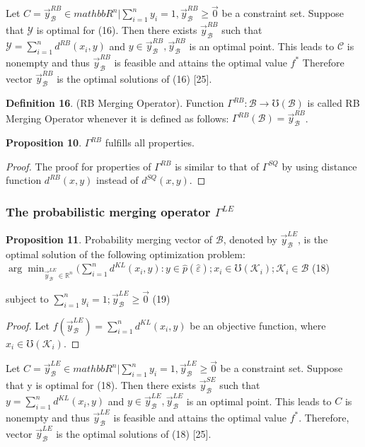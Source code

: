\documentclass[]{iosart2c}
\begin{document}
    Let $C = { \vec{y}^{RB}_\mathcal{B} \in mathbb{R}^n|\sum^n_{i=1} y_i = 1, \vec{y}^{RB}_\mathcal{B} \geq \vec{0} }$ be
    a constraint set. Suppose that $\mathcal{Y}$ is optimal for (16).
    Then there exists $\vec{y}^{RB}_\mathcal{B}$ such that $\mathcal{Y} = \sum^n_{i=1} d^{RB}(x_i, y)$
    and $y \in \vec{y}^{RB}_\mathcal{B} , \vec{y}^{RB}_\mathcal{B}$ is an optimal point. This leads to $\mathcal{C}$
    is nonempty and thus $\vec{y}^{RB}_\mathcal{B}$ is feasible and attains the
    optimal value $f^*$ Therefore vector $\vec{y}^{RB}_\mathcal{B}$ is the optimal
    solutions of (16) [25].

    \textbf{Definition 16}. (RB Merging Operator). Function
    $\Gamma^{RB} : \mathcal{B} \to \mho(\mathcal{B})$ is called RB Merging Operator
    whenever it is defined as follows: $\Gamma^{RB}(\mathcal{B}) = \vec{y}^{RB}_\mathcal{B}$.

    \textbf{Proposition 10}. $\Gamma^{RB}$ fulfills all properties.

    \begin{proof}
        The proof for properties of $\Gamma^{RB}$ is similar
        to that of $\Gamma^{SQ}$ by using distance function $d^{RB}(x, y)$
        instead of $d^{SQ}(x, y)$.
    \end{proof}

    \subsubsection{The probabilistic merging operator $\Gamma^{LE}$}

    \textbf{Proposition 11}. Probability merging vector of $\mathcal{B}$,
    denoted by $\vec{y}^{LE}_\mathcal{B}$, is the optimal solution of the following optimization problem:
    $\arg \min_{\vec{y}^{LE}_\mathcal{B} \in \mathbb{R}^n} (\sum^n_{i=1} d^{KL}(x_i, y) :
    y \in \hat{p}(\hat{\varepsilon}); x_i \in \mho(\mathcal{K}_i);\mathcal{K}_i \in \mathcal{B}$ (18)

    subject to $\sum^n_{i=1} y_i = 1; \vec{y}^{LE}_\mathcal{B} \geq \vec{0}$ (19)

    \begin{proof}
        Let $f(\vec{y}^{LE}_\mathcal{B} ) = \sum^n_{i=1} d^{KL}(x_i, y)$ be an objective function, where $x_i \in \mho(\mathcal{K}_i)$.
    \end{proof}

    Let $C = {\vec{y}^{LE}_\mathcal{B} \in mathbb{R}^n|\sum^n_{i=1} y_i = 1, \vec{y}^{LE}_\mathcal{B} \geq \vec{0} }$ be a
    constraint set. Suppose that y is optimal for (18).
    Then there exists $\vec{y}^{SE}_\mathcal{B}$ such that $y = \sum^n_{i=1} d^{KL}(x_i, y)$
    and $y \in \vec{y}^{LE}_\mathcal{B} , \vec{y}^{LE}_\mathcal{B}$ is an optimal point. This leads to
    $C$ is nonempty and thus $\vec{y}^{LE}_\mathcal{B}$ is feasible and attains
    the optimal value $f^*$. Therefore, vector $\vec{y}^{LE}_\mathcal{B}$ is the
    optimal solutions of (18) [25].
\end{document}
